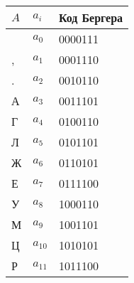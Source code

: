 \begin{tabular}{lll}
\toprule
$A$ & $a_i$ & Код Бергера \\
\midrule
  & $a_{0}$ & 0000111 \\
, & $a_{1}$ & 0001110 \\
. & $a_{2}$ & 0010110 \\
А & $a_{3}$ & 0011101 \\
Г & $a_{4}$ & 0100110 \\
Л & $a_{5}$ & 0101101 \\
Ж & $a_{6}$ & 0110101 \\
Е & $a_{7}$ & 0111100 \\
У & $a_{8}$ & 1000110 \\
М & $a_{9}$ & 1001101 \\
Ц & $a_{10}$ & 1010101 \\
Р & $a_{11}$ & 1011100 \\
\bottomrule
\end{tabular}
